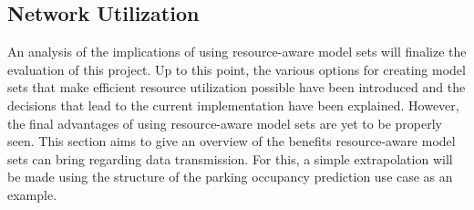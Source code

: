   
  
\subsection{Network Utilization}


An analysis of the implications of using resource-aware model sets will finalize the evaluation of this project. Up to this point, the various options for creating model sets that make efficient resource utilization possible have been introduced and the decisions that lead to the current implementation have been explained. However, the final advantages of using resource-aware model sets are yet to be properly seen. This section aims to give an overview of the benefits resource-aware model sets can bring regarding data transmission. For this, a simple extrapolation will be made using the structure of the parking occupancy prediction use case as an example.

